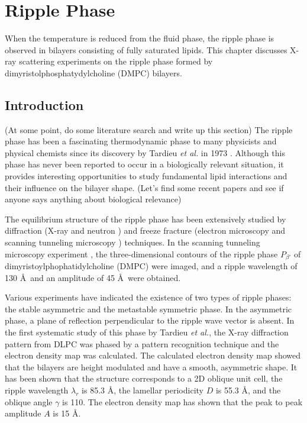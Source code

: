 \chapter{Ripple Phase}
When the temperature is reduced from the fluid phase, 
the ripple phase is observed in bilayers consisting of fully saturated lipids.
This chapter discusses X-ray scattering experiments on the ripple phase 
formed by dimyristolphosphatydylcholine (DMPC) bilayers. 

\section{Introduction}
(At some point, do some literature search and write up this section)
The ripple phase has been a fascinating thermodynamic phase to many physicists 
and physical chemists since its discovery by Tardieu \textit{et al.} 
in 1973 \cite{ref:Tardieu73}. Although this phase has never been reported to 
occur in a biologically relevant situation, it provides interesting opportunities
to study fundamental lipid interactions and their influence on the bilayer 
shape. (Let's find some recent papers and see if anyone says anything about
biological relevance)

The equilibrium structure of the ripple phase has been extensively studied by
diffraction (X-ray \cite{} and neutron \cite{}) and freeze fracture
(electron microscopy \cite{} and scanning tunneling microscopy \cite{}) techniques.
In the scanning tunneling microscopy experiment \cite{ref:Zasadzinski88}, 
the three-dimensional contours of the ripple phase $P_{\beta'}$ of
dimyristoylphophatidylcholine (DMPC) were imaged, and
a ripple wavelength of 130 \AA\ and an amplitude of 45 \AA\ were obtained.

Various experiments have indicated the existence of two types of ripple phases:
the stable asymmetric and the metastable symmetric phase. In the asymmetric
phase, a plane of reflection perpendicular to the ripple wave vector is 
absent. In the first systematic study of this phase by Tardieu \textit{et al.},
the X-ray diffraction pattern from DLPC was phased by a pattern recognition
technique and the electron density map was calculated. The calculated 
electron density map showed that the bilayers are height modulated
and have a smooth, asymmetric shape. It has been shown that the structure
corresponds to a 2D oblique unit cell, the ripple wavelength $\lambda_r$ is
85.3 \AA, the lamellar periodicity $D$ is 55.3 \AA, and the oblique angle
$\gamma$ is 110\textdegree. The electron density map has shown that
the peak to peak amplitude $A$ is 15 \AA.

